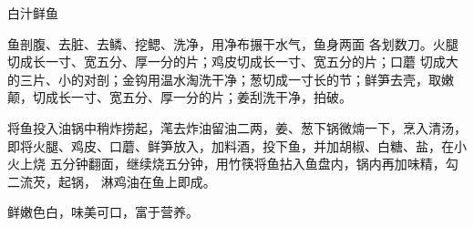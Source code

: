 %
%
%
%
%
%
%
\begin{recipe}{白汁鲜鱼}

\ingredients


\preparation

\step 鱼剖腹、去脏、去鳞、挖鳃、洗净，用净布搌干水气，\xeCJKnobreak{}鱼身两面
各划数刀。火腿切成长一寸、宽五分、厚一分的片；鸡皮切成长一寸、宽五分的片；口蘑
切成大的三片、小的对剖；金钩用温水淘洗干净；葱切成一寸长的节；鲜笋去壳，取嫩
颠，切成长一寸、宽五分、厚一分的片；姜刮洗干净，拍破。

\step 将鱼投入油锅中稍炸捞起，滗去炸油留油二两，姜、葱下锅微煵一下，烹入清汤，
即将火腿、鸡皮、口蘑、鲜笋放入，加料酒，投下鱼，并加胡椒、白糖、盐，在小火上烧
五分钟翻面，继续烧五分钟，用竹筷将鱼拈入鱼盘内，锅内再加味精，勾二流芡，起锅，
淋鸡油在鱼上即成。

\features

鲜嫩色白，味美可口，富于营养。

\end{recipe}

